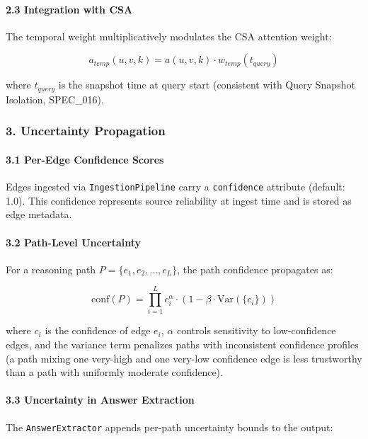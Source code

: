 \documentclass[10pt,journal,compsoc]{IEEEtran}
\begin{document}
\paragraph{2.3 Integration with CSA}
The temporal weight multi\-plicatively modulates the CSA attention weight:

\begin{equation}
a_{temp}(u,v,k) = a(u,v,k) \cdot w_{temp}(t_{query})
\end{equation}

where $t_{query}$ is the snapshot time at query start (consistent with Query Snapshot Isolation, SPEC\_016).

\subsubsection{3. Uncertainty Propagation}

\paragraph{3.1 Per-Edge Confidence Scores}
Edges ingested via \texttt{IngestionPipeline} carry a \texttt{confidence} attribute (default: 1.0). This confidence represents source reliability at ingest time and is stored as edge metadata.

\paragraph{3.2 Path-Level Uncertainty}
For a reasoning path $P = \{e_1, e_2, \ldots, e_L\}$, the path confidence propagates as:

\begin{equation}
\text{conf}(P) = \prod_{i=1}^{L} c_i^{\alpha} \cdot \left(1 - \beta \cdot \text{Var}(\{c_i\})\right)
\end{equation}

where $c_i$ is the confidence of edge $e_i$, $\alpha$ controls sensitivity to low-confidence edges, and the variance term penalizes paths with incon\-sistent confidence profiles (a path mixing one very-high and one very-low confidence edge is less trustworthy than a path with uniformly moderate confidence).

\paragraph{3.3 Uncertainty in Answer Extraction}
The \texttt{AnswerExtractor} appends per-path uncertainty bounds to the output:
\end{document}
